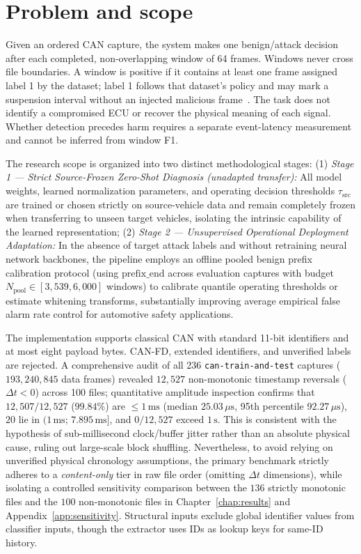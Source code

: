 \documentclass[12pt, a4paper, reqno, oneside]{book}
\newcommand\sect[1]{%
  \Needspace{5\baselineskip}%
  \phantomsection%
  \addcontentsline{toc}{section}{#1}%
  \section*{#1}%
}
\begin{document}
\sect{Problem and scope}
Given an ordered CAN capture, the system makes one benign/attack decision after each completed, non-overlapping window of 64 frames. Windows never cross file boundaries. A window is positive if it contains at least one frame assigned label 1 by the dataset; label 1 follows that dataset's policy and may mark a suspension interval without an injected malicious frame~\cite{rajapaksha2024canmirgu}. The task does not identify a compromised ECU or recover the physical meaning of each signal. Whether detection precedes harm requires a separate event-latency measurement and cannot be inferred from window F1.

The research scope is organized into two distinct methodological stages:
(1) \textit{Stage 1 --- Strict Source-Frozen Zero-Shot Diagnosis (unadapted transfer):} All model weights, learned normalization parameters, and operating decision thresholds $\tau_{\text{src}}$ are trained or chosen strictly on source-vehicle data and remain completely frozen when transferring to unseen target vehicles, isolating the intrinsic capability of the learned representation;
(2) \textit{Stage 2 --- Unsupervised Operational Deployment Adaptation:} In the absence of target attack labels and without retraining neural network backbones, the pipeline employs an offline pooled benign prefix calibration protocol (using $\mathrm{prefix\_end}$ across evaluation captures with budget $N_{\text{pool}} \in [3{,}539, 6{,}000]$ windows) to calibrate quantile operating thresholds or estimate whitening transforms, substantially improving average empirical false alarm rate control for automotive safety applications.

The implementation supports classical CAN with standard 11-bit identifiers and at most eight payload bytes. CAN-FD, extended identifiers, and unverified labels are rejected. A comprehensive audit of all 236 \texttt{can-train-and-test} captures ($193,240,845$ data frames) revealed $12,527$ non-monotonic timestamp reversals ($\Delta t < 0$) across 100 files; quantitative amplitude inspection confirms that $12,507/12,527$ ($99.84\%$) are $\le 1\,\text{ms}$ (median $25.03\,\mu\text{s}$, 95th percentile $92.27\,\mu\text{s}$), $20$ lie in $(1\,\text{ms};\, 7.895\,\text{ms}]$, and $0/12,527$ exceed $1\,\text{s}$. This is consistent with the hypothesis of sub-millisecond clock/buffer jitter rather than an absolute physical cause, ruling out large-scale block shuffling. Nevertheless, to avoid relying on unverified physical chronology assumptions, the primary benchmark strictly adheres to a \textit{content-only} tier in raw file order (omitting $\Delta t$ dimensions), while isolating a controlled sensitivity comparison between the $136$ strictly monotonic files and the $100$ non-monotonic files in Chapter~\ref{chap:results} and Appendix~\ref{app:sensitivity}. Structural inputs exclude global identifier values from classifier inputs, though the extractor uses IDs as lookup keys for same-ID history.
\end{document}

